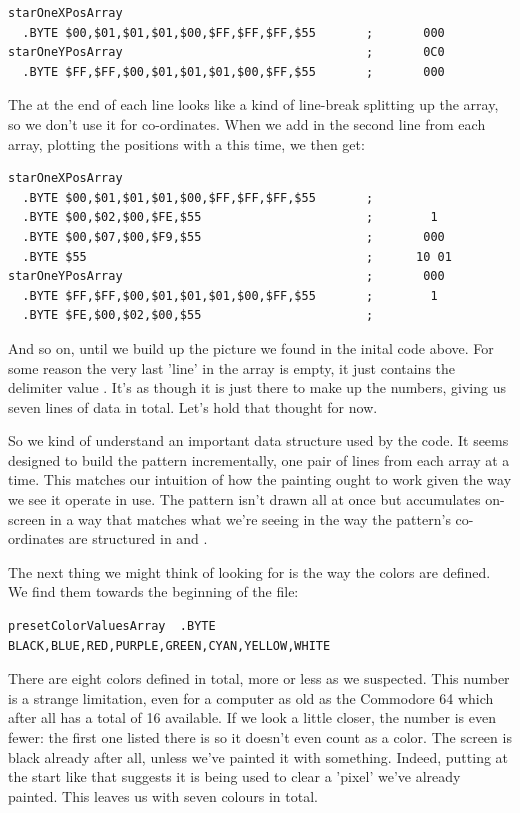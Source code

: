 \begin{lstlisting}
starOneXPosArray  
  .BYTE $00,$01,$01,$01,$00,$FF,$FF,$FF,$55       ;       000      
starOneYPosArray                                  ;       0C0        
  .BYTE $FF,$FF,$00,$01,$01,$01,$00,$FF,$55       ;       000      
\end{lstlisting}

The  at the end of each line looks like a kind of line-break splitting up the array, so we don't use it for
co-ordinates. 
When we add in the second line from each array, plotting the positions with a  this time, we then get:

\begin{lstlisting}[caption=Source code for the Star.]
starOneXPosArray  
  .BYTE $00,$01,$01,$01,$00,$FF,$FF,$FF,$55       ;                
  .BYTE $00,$02,$00,$FE,$55                       ;        1 
  .BYTE $00,$07,$00,$F9,$55                       ;       000      
  .BYTE $55                                       ;      10 01       
starOneYPosArray                                  ;       000
  .BYTE $FF,$FF,$00,$01,$01,$01,$00,$FF,$55       ;        1  
  .BYTE $FE,$00,$02,$00,$55                       ; 
\end{lstlisting}

And so on, until we build up the picture we found in the inital code above. For some reason the very last 'line' in the 
array is empty, it just contains the delimiter value . It's as though it is just there to make up the numbers, giving us
seven lines of data in total. Let's hold that thought for now.

So we kind of understand an important data structure used
by the code. It seems designed to build the pattern incrementally, one pair of lines from each array at a time.
This matches our intuition of how the painting ought to work given the way we see it operate in use. The pattern isn't drawn
all at once but accumulates on-screen in a way that matches what we're seeing in the way the pattern's co-ordinates
are structured in  and .

The next thing we might think of looking for is the way the colors are defined. We find them towards the beginning of the file:
\begin{lstlisting}
presetColorValuesArray  .BYTE BLACK,BLUE,RED,PURPLE,GREEN,CYAN,YELLOW,WHITE
\end{lstlisting}

There are eight colors defined in total, more or less as we suspected. This number is a strange limitation, even for a computer as old
as the Commodore 64 which after all has a total of 16 available. If we look a little closer, the number is even
fewer: the first one listed there is  so it doesn't even count as a color. The screen is black already after all, unless we've
painted it with something. Indeed, putting  at the 
start like that suggests it is being used to clear a 'pixel' we've already painted. This leaves us with seven 
colours in total. 

